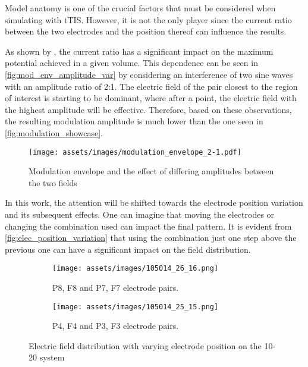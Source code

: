 Model anatomy is one of the crucial factors that must be considered when simulating with \gls{tTIS}. However, it is not the only player since the current ratio between the two electrodes and the position thereof can influence the results.

As shown by , the current ratio has a significant impact on the maximum potential achieved in a given volume. This dependence can be seen in \autoref{fig:mod_env_amplitude_var} by considering an interference of two sine waves with an amplitude ratio of 2:1. The electric field of the pair closest to the region of interest is starting to be dominant, where after a point, the electric field with the highest amplitude will be effective. Therefore, based on these observations, the resulting modulation amplitude is much lower than the one seen in \autoref{fig:modulation_showcase}.
\begin{figure}[H]
    \centering
    \texttt{[image: assets/images/modulation\_envelope\_2-1.pdf]}
    \caption{Modulation envelope and the effect of differing amplitudes between the two fields}
    \label{fig:mod_env_amplitude_var}
\end{figure}
In this work, the attention will be shifted towards the electrode position variation and its subsequent effects. One can imagine that moving the electrodes or changing the combination used can impact the final pattern. It is evident from \autoref{fig:elec_position_variation} that using the combination just one step above the previous one can have a significant impact on the field distribution.
\begin{figure}[H]
    \centering
    \begin{subfigure}[b]{0.49\textwidth}
        \texttt{[image: assets/images/105014\_26\_16.png]}
        \caption{P8, F8 and P7, F7 electrode pairs.}
        \label{fig:26_16_elec_pair}
    \end{subfigure}
    \begin{subfigure}[b]{0.49\textwidth}
        \texttt{[image: assets/images/105014\_25\_15.png]}
        \caption{P4, F4 and P3, F3 electrode pairs.}
        \label{fig:25_15_elec_pair}
    \end{subfigure}
    \caption{Electric field distribution with varying electrode position on the 10-20 system}
    \label{fig:elec_position_variation}
\end{figure}

